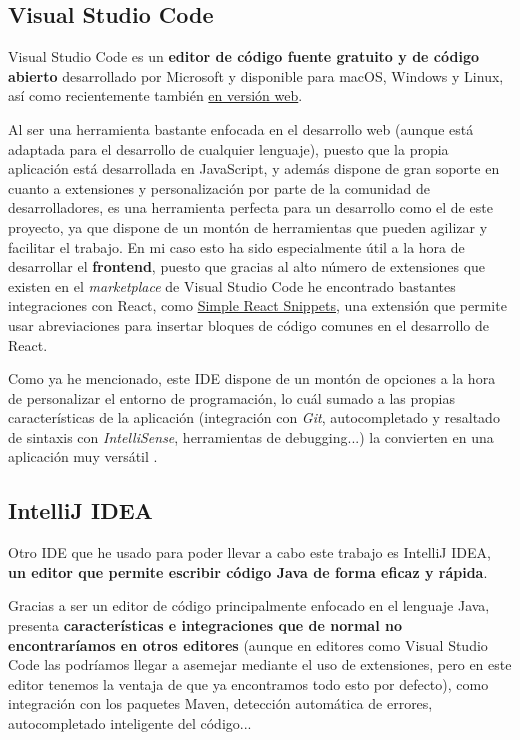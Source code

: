 \subsection{Visual Studio Code}

Visual Studio Code es un \textbf{editor de código fuente gratuito y de código abierto} desarrollado por Microsoft y disponible para macOS, Windows y Linux, así como recientemente también \href{https://vscode.dev}{en versión web}.

Al ser una herramienta bastante enfocada en el desarrollo web (aunque está adaptada para el desarrollo de cualquier lenguaje), puesto que la propia aplicación está desarrollada en JavaScript, y además dispone de gran soporte en cuanto a extensiones y personalización por parte de la comunidad de desarrolladores, es una herramienta perfecta para un desarrollo como el de este proyecto, ya que dispone de un montón de herramientas que pueden agilizar y facilitar el trabajo. En mi caso esto ha sido especialmente útil a la hora de desarrollar el \textbf{frontend}, puesto que gracias al alto número de extensiones que existen en el \textit{marketplace} de Visual Studio Code he encontrado bastantes integraciones con React, como \href{https://marketplace.visualstudio.com/items?itemName=burkeholland.simple-react-snippets}{Simple React Snippets}, una extensión que permite usar abreviaciones para insertar bloques de código comunes en el desarrollo de React.

Como ya he mencionado, este IDE dispone de un montón de opciones a la hora de personalizar el entorno de programación, lo cuál sumado a las propias características de la aplicación (integración con \textit{Git}, autocompletado y resaltado de sintaxis con \textit{IntelliSense}, herramientas de debugging...) la convierten en una aplicación muy versátil \cite{vscode:main}.

\subsection{IntelliJ IDEA}

Otro IDE que he usado para poder llevar a cabo este trabajo es IntelliJ IDEA, \textbf{un editor que permite escribir código Java de forma eficaz y rápida}. 

Gracias a ser un editor de código principalmente enfocado en el lenguaje Java, presenta \textbf{características e integraciones que de normal no encontraríamos en otros editores} (aunque en editores como Visual Studio Code las podríamos llegar a asemejar mediante el uso de extensiones, pero en este editor tenemos la ventaja de que ya encontramos todo esto por defecto), como integración con los paquetes Maven, detección automática de errores, autocompletado inteligente del código... \cite{jetbrains:idea}

